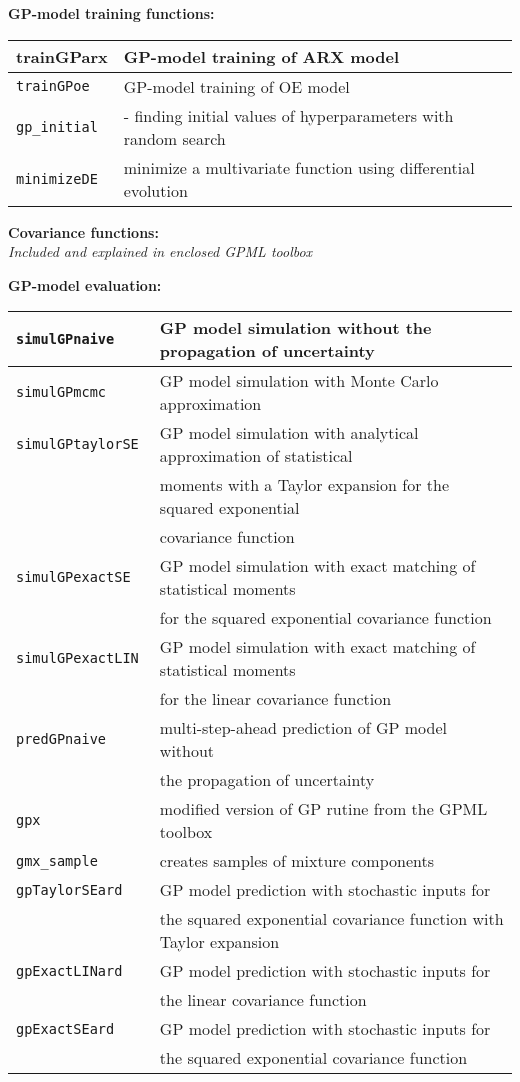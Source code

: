 \documentclass[12pt,twoside]{article}
\newcommand{\fun}[1]{\tt #1}
\begin{document}
{\renewcommand{\arraystretch}{1.1}

\pagebreak[0]
\textbf{GP-model training functions:} \\
\begin{tabular}{|l|l|}
 \hline trainGParx & GP-model training of ARX model \\
 \hline \fun{trainGPoe} & GP-model training of OE model \\
 \hline \fun{gp\_initial} & - finding initial values of hyperparameters with random search  \\
  \hline \fun{minimizeDE} & minimize a multivariate function using differential evolution \\
  \hline
\end{tabular}

\pagebreak[0]
\textbf{Covariance functions:} \\
{\it Included and explained in enclosed GPML toolbox}

\pagebreak[0]
\textbf{GP-model evaluation:} \\
\begin{tabular}{|l|l|}
 \hline \fun{simulGPnaive} & GP model simulation without the propagation of uncertainty \\
 \hline \fun{simulGPmcmc} & GP model simulation with Monte Carlo approximation\\
 \hline \fun{simulGPtaylorSE} & GP model simulation with analytical approximation of statistical\\
 & moments with a Taylor expansion for the squared exponential\\
 & covariance function\\
 \hline \fun{simulGPexactSE} & GP model simulation with exact matching of statistical moments\\
 &for the squared exponential covariance function \\
 \hline \fun{simulGPexactLIN} & GP model simulation with exact matching of statistical moments\\
 &for the linear covariance function \\
 \hline \fun{predGPnaive} & multi-step-ahead prediction of GP model without\\
 &the propagation of uncertainty\\
 \hline \fun{gpx} & modified version of GP rutine from the GPML toolbox \\
 \hline \fun{gmx\_sample} & creates samples of mixture components \\
 \hline \fun{gpTaylorSEard} & GP model prediction with stochastic inputs for\\ &the squared exponential covariance function with Taylor expansion\\
 \hline \fun{gpExactLINard} & GP model prediction with stochastic inputs for\\ &the linear covariance function \\
 \hline \fun{gpExactSEard} & GP model prediction with stochastic inputs for\\ &the squared exponential covariance function \\
 \hline
%
\end{tabular}

}
\end{document}
